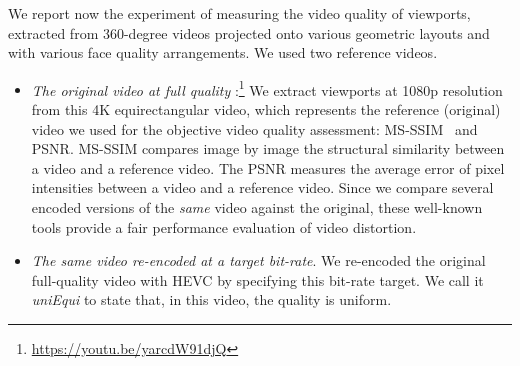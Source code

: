 We report now the experiment of measuring the video quality of
viewports, extracted from 360-degree videos
projected onto various geometric layouts and with various face quality
arrangements. We used two reference videos.
\begin{itemize}%

   \item \emph{The original video at full quality}%
   :\footnote{\url{https://youtu.be/yarcdW91djQ}}
	We extract viewports at 1080p resolution from this 4K
   equirectangular video, which represents the reference (original)
   video we used for the objective video quality assessment:
   \ac{MS-SSIM}~\cite{wang2003multiscale} and
   \ac{PSNR}.
  \ac{MS-SSIM} compares image by image the structural
   similarity between a video and a reference video. %
   The \ac{PSNR} measures the average error of pixel intensities
   between a video and a reference video. %
   Since we
   compare several encoded versions of the \emph{same} video against the
   original, these well-known tools provide a fair performance evaluation of video distortion.

   \item \emph{The same video re-encoded at a target bit-rate}.
   We re-encoded the original full-quality video with \ac{HEVC}
   by specifying this bit-rate target. We call it \emph{uniEqui} to
   state that, in this video, the quality is uniform.
\end{itemize}


